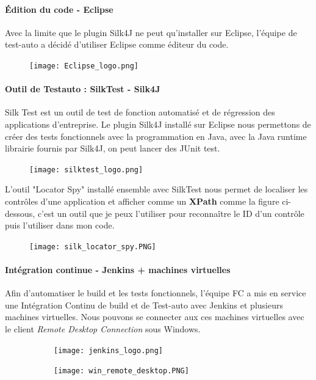     \paragraph{Édition du code - Eclipse}
    Avec la limite que le plugin Silk4J ne peut qu'installer sur Eclipse, l'équipe de test-auto a décidé d'utiliser Eclipse comme éditeur du code.
    \begin{figure}[H]
    	\flushleft
    	\texttt{[image: Eclipse\_logo.png]}
    	\label{fig:eclipse_logo}
    \end{figure}
    
    \paragraph{Outil de Testauto : SilkTest - Silk4J}
    \par Silk Test est un outil de test de fonction automatisé et de régression des applications d'entreprise. Le plugin Silk4J installé sur Eclipse nous permettons de créer des tests fonctionnels avec la programmation en Java, avec la Java runtime librairie fournis par Silk4J, on peut lancer des JUnit test.
    \begin{figure}[H]
    	\flushleft
    	\texttt{[image: silktest\_logo.png]}
    	\label{fig:silktest_logo}
    \end{figure}
    
    \par L'outil "Locator Spy" installé ensemble avec SilkTest nous permet de localiser les contrôles d'une application et afficher comme un \textbf{XPath} comme la figure ci-dessous, c'est un outil que je peux l'utiliser pour reconnaître le ID d'un contrôle puis l'utiliser dans mon code.
    \begin{figure}[H]
    	\flushleft
    	\texttt{[image: silk\_locator\_spy.PNG]}
    	\label{fig:silk_locator_spy_label}
    \end{figure}
    
    \paragraph{Intégration continue - Jenkins + machines virtuelles}
    Afin d'automatiser le build et les tests fonctionnels, l'équipe FC a mis en service une Intégration Continu de build et de Test-auto avec Jenkins et plusieurs machines virtuelles. Nous pouvons se connecter aux ces machines virtuelles avec le client \textit{Remote Desktop Connection} sous Windows.
    \begin{figure}[H]
    	\flushleft 
    	\begin{subfigure}[b]{.35\textwidth}
    		\texttt{[image: jenkins\_logo.png]}
    	\end{subfigure}
    	\begin{subfigure}[b]{.35\textwidth}
    		\texttt{[image: win\_remote\_desktop.PNG]}
    	\end{subfigure}
    	\label{jenksin_+_win_remote_desktop_label}
    \end{figure}
    
